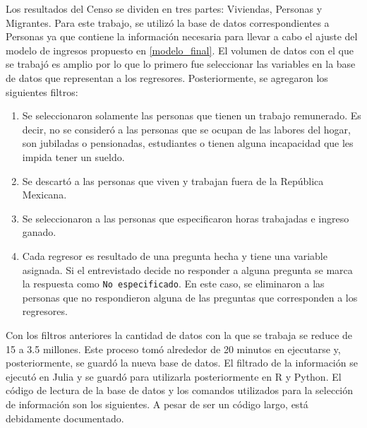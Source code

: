 Los resultados del Censo se dividen en tres partes: Viviendas, Personas y Migrantes. Para este trabajo, se utilizó la base de datos correspondientes a Personas ya que contiene la información necesaria para llevar a cabo el ajuste del modelo de ingresos propuesto en \ref{modelo_final}. El volumen de datos con el que se trabajó es amplio por lo que lo primero fue seleccionar las variables en la base de datos que representan a los regresores. Posteriormente, se agregaron los siguientes filtros:

\begin{enumerate}
    \item Se seleccionaron solamente las personas que tienen un trabajo remunerado. Es decir, no se consideró a las personas que
    se ocupan de las labores del hogar, son jubiladas o pensionadas, estudiantes o tienen alguna incapacidad que les impida tener un sueldo. 
    
    \item Se descartó a las personas que viven y trabajan fuera de la República Mexicana. 
    
    \item Se seleccionaron a las personas que especificaron horas trabajadas e ingreso ganado.
    
    \item Cada regresor es resultado de una pregunta hecha y tiene una variable asignada. Si el entrevistado decide no responder a alguna pregunta se marca la respuesta como \texttt{No especificado}. En este caso, se eliminaron a las personas que no respondieron alguna de las preguntas que corresponden a los regresores. 
\end{enumerate}

Con los filtros anteriores la cantidad de datos con la que se trabaja se reduce de 15 a 3.5 millones. Este proceso tomó alrededor de 20 minutos en ejecutarse y, posteriormente, se guardó la nueva base de datos. El filtrado de la información se ejecutó en \textsf{Julia} y se guardó para utilizarla posteriormente en \textsf{R} y \textsf{Python}. El código de lectura de la base de datos y los comandos utilizados para la selección de información son los siguientes. A pesar de ser un código largo, está debidamente documentado. 


